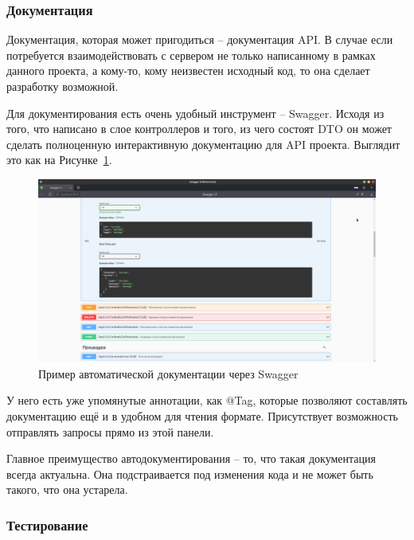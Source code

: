 \documentclass[a4paper,article]{article}
\begin{document}
\begin{sloppypar}
    \subsubsection{Документация}\label{Реализация. Сервер. Документация}

    Документация, которая может пригодиться -- документация API. В случае если потребуется взаимодействовать с сервером не только написанному в рамках данного проекта, а кому-то, кому неизвестен исходный код, то она сделает разработку возможной.

    Для документирования есть очень удобный инструмент -- Swagger. Исходя из того, что написано в слое контроллеров и того, из чего состоят DTO он может сделать полноценную интерактивную документацию для API проекта. Выглядит это как на Рисунке~\ref{fig:Swagger}.

    \begin{figure}[h]

        \centering

        \includegraphics[width=0.8\linewidth]{Swagger.png}

        \caption{\centering Пример автоматической документации через Swagger}

        \label{fig:Swagger}

    \end{figure}

    У него есть уже упомянутые аннотации, как @Tag, которые позволяют составлять документацию ещё и в удобном для чтения формате. Присутствует возможность отправлять запросы прямо из этой панели.

    Главное преимущество автодокументирования -- то, что такая документация всегда актуальна. Она подстраивается под изменения кода и не может быть такого, что она устарела.

    \subsubsection{Тестирование}\label{Реализация. Сервер. Тестирование}


\end{sloppypar}
\end{document}
